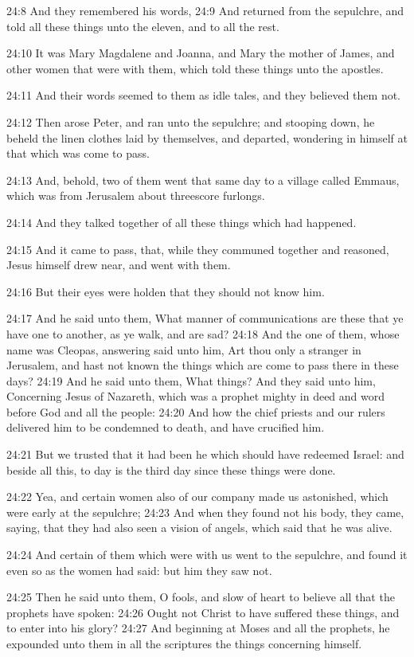24:8 And they remembered his words, 24:9 And returned from the
sepulchre, and told all these things unto the eleven, and to all the
rest.

24:10 It was Mary Magdalene and Joanna, and Mary the mother of James,
and other women that were with them, which told these things unto the
apostles.

24:11 And their words seemed to them as idle tales, and they believed
them not.

24:12 Then arose Peter, and ran unto the sepulchre; and stooping down,
he beheld the linen clothes laid by themselves, and departed,
wondering in himself at that which was come to pass.

24:13 And, behold, two of them went that same day to a village called
Emmaus, which was from Jerusalem about threescore furlongs.

24:14 And they talked together of all these things which had happened.

24:15 And it came to pass, that, while they communed together and
reasoned, Jesus himself drew near, and went with them.

24:16 But their eyes were holden that they should not know him.

24:17 And he said unto them, What manner of communications are these
that ye have one to another, as ye walk, and are sad?  24:18 And the
one of them, whose name was Cleopas, answering said unto him, Art thou
only a stranger in Jerusalem, and hast not known the things which are
come to pass there in these days?  24:19 And he said unto them, What
things? And they said unto him, Concerning Jesus of Nazareth, which
was a prophet mighty in deed and word before God and all the people:
24:20 And how the chief priests and our rulers delivered him to be
condemned to death, and have crucified him.

24:21 But we trusted that it had been he which should have redeemed
Israel: and beside all this, to day is the third day since these
things were done.

24:22 Yea, and certain women also of our company made us astonished,
which were early at the sepulchre; 24:23 And when they found not his
body, they came, saying, that they had also seen a vision of angels,
which said that he was alive.

24:24 And certain of them which were with us went to the sepulchre,
and found it even so as the women had said: but him they saw not.

24:25 Then he said unto them, O fools, and slow of heart to believe
all that the prophets have spoken: 24:26 Ought not Christ to have
suffered these things, and to enter into his glory?  24:27 And
beginning at Moses and all the prophets, he expounded unto them in all
the scriptures the things concerning himself.

